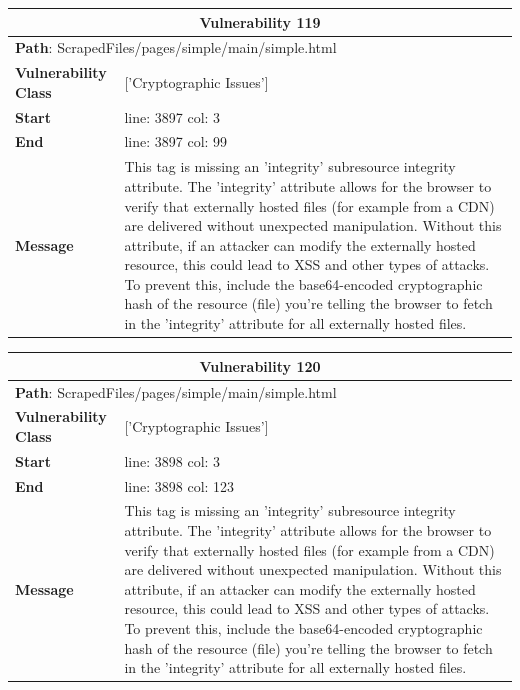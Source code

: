 \documentclass[12pt]{article}
\begin{document}
\begin{table}[!h]
\centering
\renewcommand{\arraystretch}{1.3}
\begin{tabular}{|l|p{10cm}|}
\hline
\multicolumn{2}{|c|}{\textbf{Vulnerability 119}} \\
\hline
\multicolumn{2}{|l|}{\textbf{Path}: ScrapedFiles/pages/simple/main/simple.html} \\
\hline
\textbf{Vulnerability Class} & ['Cryptographic Issues'] \\
\hline
\textbf{Start} & line: 3897 \quad col: 3 \\
\hline
\textbf{End} & line: 3897 \quad col: 99 \\
\hline
\textbf{Message} & This tag is missing an 'integrity' subresource integrity attribute. The 'integrity' attribute allows for the browser to verify that externally hosted files (for example from a CDN) are delivered without unexpected manipulation. Without this attribute, if an attacker can modify the externally hosted resource, this could lead to XSS and other types of attacks. To prevent this, include the base64-encoded cryptographic hash of the resource (file) you're telling the browser to fetch in the 'integrity' attribute for all externally hosted files. \\
\hline
\end{tabular}
\end{table}
\vspace{0.7cm}
\FloatBarrier
\begin{table}[!h]
\centering
\renewcommand{\arraystretch}{1.3}
\begin{tabular}{|l|p{10cm}|}
\hline
\multicolumn{2}{|c|}{\textbf{Vulnerability 120}} \\
\hline
\multicolumn{2}{|l|}{\textbf{Path}: ScrapedFiles/pages/simple/main/simple.html} \\
\hline
\textbf{Vulnerability Class} & ['Cryptographic Issues'] \\
\hline
\textbf{Start} & line: 3898 \quad col: 3 \\
\hline
\textbf{End} & line: 3898 \quad col: 123 \\
\hline
\textbf{Message} & This tag is missing an 'integrity' subresource integrity attribute. The 'integrity' attribute allows for the browser to verify that externally hosted files (for example from a CDN) are delivered without unexpected manipulation. Without this attribute, if an attacker can modify the externally hosted resource, this could lead to XSS and other types of attacks. To prevent this, include the base64-encoded cryptographic hash of the resource (file) you're telling the browser to fetch in the 'integrity' attribute for all externally hosted files. \\
\hline
\end{tabular}
\end{table}
\end{document}
